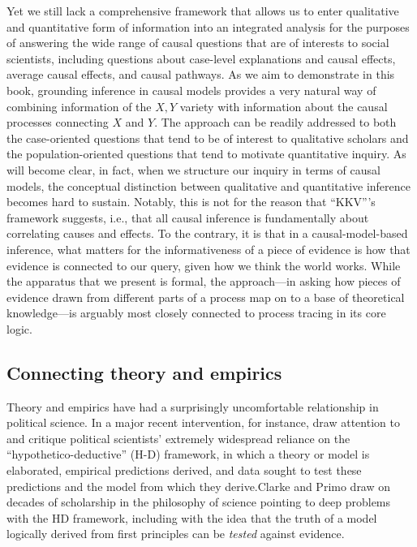 \documentclass[12pt,]{book}
\begin{document}
Yet we still lack a comprehensive framework that allows us to enter qualitative and quantitative form of information into an integrated analysis for the purposes of answering the wide range of causal questions that are of interests to social scientists, including questions about case-level explanations and causal effects, average causal effects, and causal pathways. As we aim to demonstrate in this book, grounding inference in causal models provides a very natural way of combining information of the \(X,Y\) variety with information about the causal processes connecting \(X\) and \(Y\). The approach can be readily addressed to both the case-oriented questions that tend to be of interest to qualitative scholars and the population-oriented questions that tend to motivate quantitative inquiry. As will become clear, in fact, when we structure our inquiry in terms of causal models, the conceptual distinction between qualitative and quantitative inference becomes hard to sustain. Notably, this is not for the reason that ``KKV'''s framework suggests, i.e., that all causal inference is fundamentally about correlating causes and effects. To the contrary, it is that in a causal-model-based inference, what matters for the informativeness of a piece of evidence is how that evidence is connected to our query, given how we think the world works. While the apparatus that we present is formal, the approach---in asking how pieces of evidence drawn from different parts of a process map on to a base of theoretical knowledge---is arguably most closely connected to process tracing in its core logic.

\hypertarget{connecting-theory-and-empirics}{%
\subsection{Connecting theory and empirics}\label{connecting-theory-and-empirics}}

Theory and empirics have had a surprisingly uncomfortable relationship in political science. In a major recent intervention, for instance, \citet{clarke2012model} draw attention to and critique political scientists' extremely widespread reliance on the ``hypothetico-deductive'' (H-D) framework, in which a theory or model is elaborated, empirical predictions derived, and data sought to test these predictions and the model from which they derive.Clarke and Primo draw on decades of scholarship in the philosophy of science pointing to deep problems with the HD framework, including with the idea that the truth of a model logically derived from first principles can be \emph{tested} against evidence.
\end{document}
